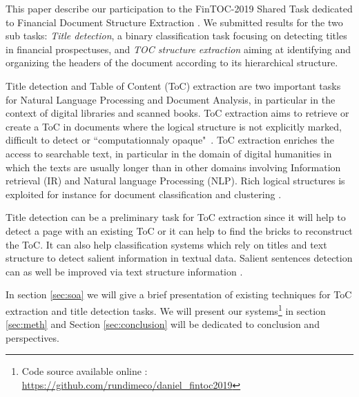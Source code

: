 This paper describe our participation to the FinTOC-2019 Shared Task dedicated to Financial Document Structure Extraction \cite{juge2019fintoc}. We submitted results for the two sub tasks:  \emph{Title detection}, a binary classification task focusing on detecting titles in financial prospectuses, and \emph{TOC structure extraction} aiming at identifying and organizing the headers of the document according to its hierarchical structure.

 Title detection and Table of Content (ToC) extraction are two important tasks for Natural Language Processing and Document Analysis, in particular in the context of digital libraries and scanned books.
ToC extraction aims to retrieve or create a ToC in documents where the logical structure is not explicitly marked, difficult to detect or ``computationnaly opaque"~\cite{DeBusser-2006a}.
  ToC extraction enriches the access to searchable text, in particular in the domain of digital humanities in which the texts are usually longer than in other domains involving Information retrieval (IR) and Natural language Processing (NLP).
Rich logical structures is exploited for instance for document classification and clustering \cite{Doucet-2006a,Elhadj-2012}.

 Title detection can be a preliminary task for ToC extraction since it will help to detect a page with an existing ToC or it can help to find the bricks to reconstruct the ToC. It can also help classification systems which rely on titles and text structure to detect salient information in textual data\cite{Lejeune-2015}. Salient sentences detection can as well be improved via text structure information \cite{Denil-2015}.
 
  In section \ref{sec:soa} we will give a brief presentation of existing techniques for ToC extraction and title detection tasks. We will present our systems\footnote{Code source available online : \url{https://github.com/rundimeco/daniel_fintoc2019}} in section \ref{sec:meth} and Section \ref{sec:conclusion} will be dedicated to conclusion and perspectives.
 
